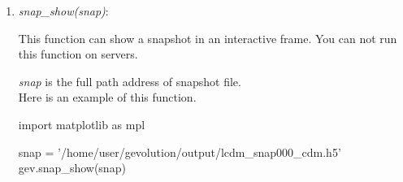 \documentclass[a4paper, 12 pt]{article}
\begin{document}
\begin{enumerate}
\item \textit{snap\_show(snap)}:

This function can show a snapshot in an interactive frame. You can not run this function on servers.

\textit{snap} is the full path address of snapshot file.\\

Here is an example of this function.
\begin{python}[language=Python, caption=snap show]
import matplotlib as mpl

snap = '/home/user/gevolution/output/lcdm_snap000_cdm.h5'
gev.snap_show(snap)
\end{python}

\end{enumerate}




\end{document}
